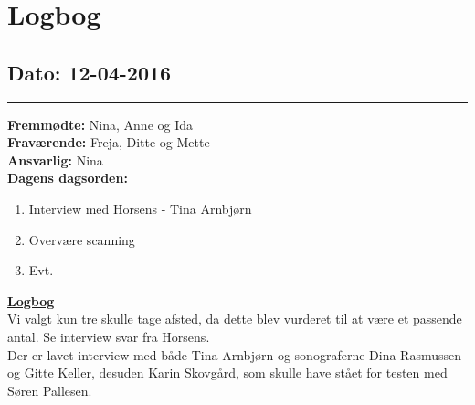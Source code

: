 \chapter{Logbog}
\section{Dato: 12-04-2016}
\hrule
\textbf{Fremmødte:} Nina, Anne og Ida \\
\textbf{Fraværende:} Freja, Ditte og Mette  \\
\textbf{Ansvarlig: }Nina  \\
\textbf{Dagens dagsorden: }
\begin{enumerate}
	\item Interview med Horsens - Tina Arnbjørn
	\item Overvære scanning
	\item Evt. 
\end{enumerate}

\underline{\textbf{Logbog}}\\
Vi valgt kun tre skulle tage afsted, da dette blev vurderet til at være et passende antal.
Se interview svar fra Horsens.\\
Der er lavet interview med både Tina Arnbjørn og sonograferne Dina Rasmussen og Gitte Keller, desuden Karin Skovgård, som skulle have stået for testen med Søren Pallesen.